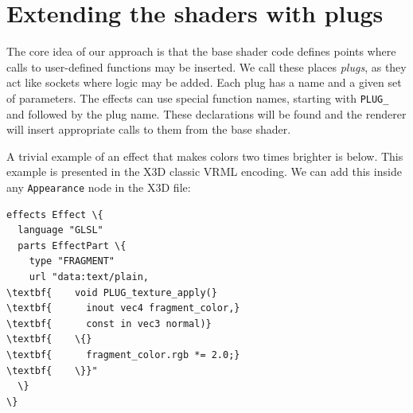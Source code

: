 \documentclass{egpubl}
\begin{document}

%
%

\section{Extending the shaders with plugs}

The core idea of our approach is that the base shader code defines
points where calls to user-defined functions may be inserted. We call
these places \textit{plugs}, as they act like sockets where logic
may be added. Each plug has a name and a given set of parameters.
The effects can use special function names, starting with \texttt{PLUG\_}
and followed by the plug name. These declarations will be found
and the renderer will insert appropriate calls to them from the base shader.

A trivial example of an effect that makes colors two times brighter
is below. This example is presented in the X3D classic VRML encoding.
We can add this inside any \texttt{Appearance} node in the X3D file:

\begin{Verbatim}[commandchars=\\\{\},frame=single,fontsize=\small]
effects Effect \{
  language "GLSL"
  parts EffectPart \{
    type "FRAGMENT"
    url "data:text/plain,
\textbf{    void PLUG_texture_apply(}
\textbf{      inout vec4 fragment_color,}
\textbf{      const in vec3 normal)}
\textbf{    \{}
\textbf{      fragment_color.rgb *= 2.0;}
\textbf{    \}}"
  \}
\}
\end{Verbatim}
\end{document}
